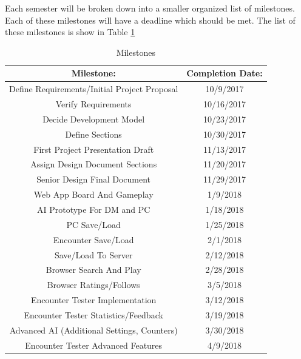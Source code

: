 \documentclass[12pt,a4paper]{report}
\begin{document}
	Each semester will be broken down into a smaller organized list of milestones. Each of these milestones will have a deadline which should be met. The list of these milestones is show in Table \ref{table: milestones}
	
	\begin{table}[H]
		\begin{center}
			\begin{tabular}{ |c|c| } 
				\hline
				Milestone: & Completion Date: \\
				\hline
				Define Requirements/Initial Project Proposal & 10/9/2017 \\
				Verify Requirements & 10/16/2017 \\
				Decide Development Model & 10/23/2017 \\
				Define Sections & 10/30/2017 \\
				First Project Presentation Draft & 11/13/2017 \\
				Assign Design Document Sections & 11/20/2017 \\
				Senior Design Final Document & 11/29/2017 \\
				Web App Board And Gameplay & 1/9/2018 \\
				AI Prototype For DM and PC & 1/18/2018 \\ 
				PC Save/Load & 1/25/2018 \\
				Encounter Save/Load & 2/1/2018 \\
				Save/Load To Server & 2/12/2018 \\
				Browser Search And Play & 2/28/2018 \\
				Browser Ratings/Follows & 3/5/2018 \\
				Encounter Tester Implementation & 3/12/2018 \\
				Encounter Tester Statistics/Feedback & 3/19/2018 \\
				Advanced AI (Additional Settings, Counters) & 3/30/2018 \\
				Encounter Tester Advanced Features & 4/9/2018 \\	
				\hline
			\end{tabular}
		\end{center}
		\caption{Milestones} \label{table: milestones}
	\end{table}
	
\end{document}

